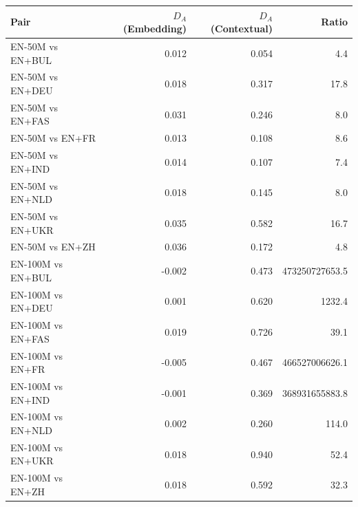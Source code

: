 \begin{tabular}{@{}lrrr@{}}
\toprule
Pair & $D_A$ (Embedding) & $D_A$ (Contextual) & Ratio \\
\midrule
EN-50M vs EN+BUL & 0.012 & 0.054 & 4.4 \\
EN-50M vs EN+DEU & 0.018 & 0.317 & 17.8 \\
EN-50M vs EN+FAS & 0.031 & 0.246 & 8.0 \\
EN-50M vs EN+FR & 0.013 & 0.108 & 8.6 \\
EN-50M vs EN+IND & 0.014 & 0.107 & 7.4 \\
EN-50M vs EN+NLD & 0.018 & 0.145 & 8.0 \\
EN-50M vs EN+UKR & 0.035 & 0.582 & 16.7 \\
EN-50M vs EN+ZH & 0.036 & 0.172 & 4.8 \\
EN-100M vs EN+BUL & -0.002 & 0.473 & 473250727653.5 \\
EN-100M vs EN+DEU & 0.001 & 0.620 & 1232.4 \\
EN-100M vs EN+FAS & 0.019 & 0.726 & 39.1 \\
EN-100M vs EN+FR & -0.005 & 0.467 & 466527006626.1 \\
EN-100M vs EN+IND & -0.001 & 0.369 & 368931655883.8 \\
EN-100M vs EN+NLD & 0.002 & 0.260 & 114.0 \\
EN-100M vs EN+UKR & 0.018 & 0.940 & 52.4 \\
EN-100M vs EN+ZH & 0.018 & 0.592 & 32.3 \\
\bottomrule
\end{tabular}
